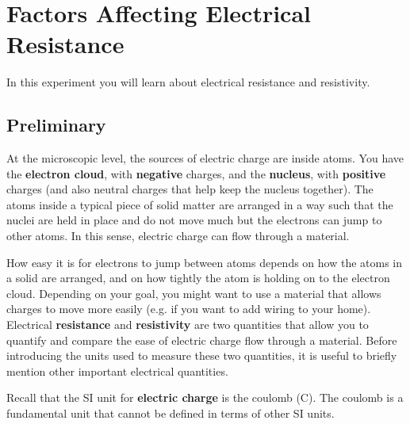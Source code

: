 \setcounter{chapter}{1}
\chapter{Factors Affecting Electrical Resistance}
In this experiment you will learn about electrical resistance and resistivity.
\section{Preliminary}
At the microscopic level, the sources of electric charge are inside atoms. You have the \textbf{electron cloud}, with \textbf{negative} charges, and the \textbf{nucleus}, with \textbf{positive} charges (and also neutral charges that help keep the nucleus together). The atoms inside a typical piece of solid matter are arranged in a way such that the nuclei are held in place and do not move much but the electrons can jump to other atoms. In this sense, electric charge can flow through a material.

How easy it is for electrons to jump between atoms depends on how the atoms in a solid are arranged, and on how tightly the atom is holding on to the electron cloud. Depending on your goal, you might want to use a material that allows charges to move more easily (e.g. if you want to add wiring to your home). Electrical \textbf{resistance} and \textbf{resistivity} are two quantities that allow you to quantify and compare the ease of electric charge flow through a material. Before introducing the units used to measure these two quantities, it is useful to briefly mention other important electrical quantities.

Recall that the SI unit for \textbf{electric charge} is the coulomb (C). The coulomb is a fundamental unit that cannot be defined in terms of other SI units.
